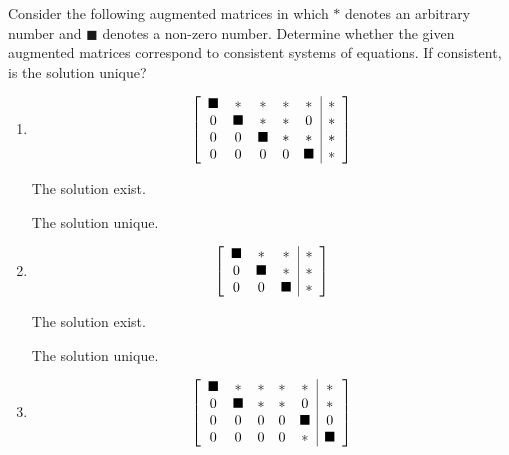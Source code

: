 \documentclass{ximera}
\author{Zack Reed}
\begin{document}
\begin{problem}

Consider the following augmented matrices in which $\ast$ denotes an
arbitrary number and $\blacksquare$ denotes a non-zero number. Determine
whether the given augmented matrices correspond to consistent systems of equations. If consistent, is the
solution unique?

\begin{enumerate}
    \item \begin{equation*}
    \startmat{ccccc|c}
      \blacksquare & \ast & \ast & \ast & \ast & \ast \\
      0 & \blacksquare & \ast & \ast & 0 & \ast \\
      0 & 0 & \blacksquare & \ast & \ast & \ast \\
      0 & 0 & 0 & 0 & \blacksquare & \ast
    \stopmat
\end{equation*}

The solution  exist.

    \begin{problem}
    
        The solution  unique.

    \end{problem}

\item \begin{equation*}
    \startmat{ccc|c}
      \blacksquare & \ast & \ast & \ast \\
      0 & \blacksquare & \ast & \ast \\
      0 & 0 & \blacksquare & \ast
    \stopmat
\end{equation*}

The solution  exist.

    \begin{problem}
    
        The solution  unique.

    \end{problem}

\item \begin{equation*}
    \startmat{ccccc|c}
      \blacksquare & \ast & \ast & \ast & \ast & \ast \\
      0 & \blacksquare & \ast & \ast & 0 & \ast \\
      0 & 0 & 0 & 0 & \blacksquare & 0 \\
      0 & 0 & 0 & 0 & \ast & \blacksquare
    \stopmat
\end{equation*}


\end{enumerate}
\end{problem}
\end{document}
